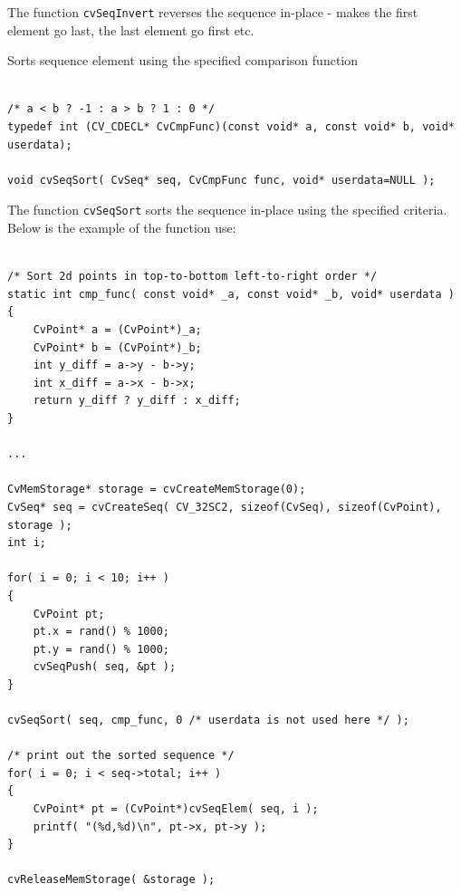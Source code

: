\begin{description}
\end{description}


The function \texttt{cvSeqInvert} reverses the sequence in-place - makes the first element go last, the last element go first etc.


\label{SeqSort}

Sorts sequence element using the specified comparison function

\begin{lstlisting}

/* a < b ? -1 : a > b ? 1 : 0 */
typedef int (CV_CDECL* CvCmpFunc)(const void* a, const void* b, void* userdata);

void cvSeqSort( CvSeq* seq, CvCmpFunc func, void* userdata=NULL );

\end{lstlisting}

\begin{description}
\end{description}

The function \texttt{cvSeqSort} sorts the sequence in-place using the specified criteria. Below is the example of the function use:

\begin{lstlisting}

/* Sort 2d points in top-to-bottom left-to-right order */
static int cmp_func( const void* _a, const void* _b, void* userdata )
{
    CvPoint* a = (CvPoint*)_a;
    CvPoint* b = (CvPoint*)_b;
    int y_diff = a->y - b->y;
    int x_diff = a->x - b->x;
    return y_diff ? y_diff : x_diff;
}

...

CvMemStorage* storage = cvCreateMemStorage(0);
CvSeq* seq = cvCreateSeq( CV_32SC2, sizeof(CvSeq), sizeof(CvPoint), storage );
int i;

for( i = 0; i < 10; i++ )
{
    CvPoint pt;
    pt.x = rand() % 1000;
    pt.y = rand() % 1000;
    cvSeqPush( seq, &pt );
}

cvSeqSort( seq, cmp_func, 0 /* userdata is not used here */ );

/* print out the sorted sequence */
for( i = 0; i < seq->total; i++ )
{
    CvPoint* pt = (CvPoint*)cvSeqElem( seq, i );
    printf( "(%d,%d)\n", pt->x, pt->y );
}

cvReleaseMemStorage( &storage );

\end{lstlisting}


